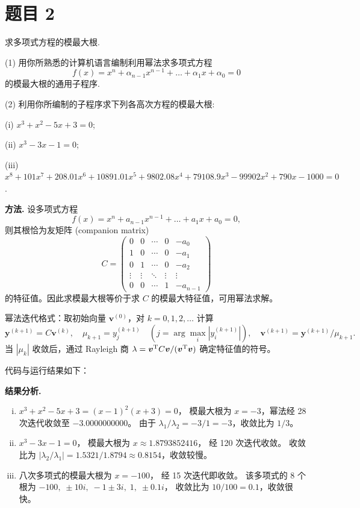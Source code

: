 \documentclass{article}
\begin{document}
\section{题目 2}

求多项式方程的模最大根.

(1) 用你所熟悉的计算机语言编制利用幂法求多项式方程
\[
  f(x) = x^n + \alpha_{n-1}x^{n-1} + \dots + \alpha_1x + \alpha_0 = 0
\]
的模最大根的通用子程序.

(2) 利用你所编制的子程序求下列各高次方程的模最大根:

(i) $x^3 + x^2 - 5x + 3 = 0$;

(ii) $x^3 - 3x - 1 = 0$;

(iii) $x^8 + 101x^7 + 208.01x^6 + 10891.01x^5 + 9802.08x^4 +
79108.9x^3 - 99902x^2 + 790x - 1000 = 0$.

\begin{solution}

  \textbf{方法.}
  设多项式方程
  \[
    f(x) = x^n + a_{n-1}x^{n-1} + \dots + a_1 x + a_0 = 0,
  \]
  则其根恰为友矩阵 (companion matrix)
  \[
    C =
    \begin{pmatrix}
      0 & 0 & \cdots & 0 & -a_0 \\
      1 & 0 & \cdots & 0 & -a_1 \\
      0 & 1 & \cdots & 0 & -a_2 \\
      \vdots & \vdots & \ddots & \vdots & \vdots \\
      0 & 0 & \cdots & 1 & -a_{n-1}
    \end{pmatrix}
  \]
  的特征值。因此求模最大根等价于求 $C$ 的模最大特征值，可用幂法求解。

  幂法迭代格式：取初始向量 $\boldsymbol{v}^{(0)}$，对 $k = 0, 1, 2, \dots$ 计算
  \[
    \boldsymbol{y}^{(k+1)} = C\boldsymbol{v}^{(k)}, \quad
    \mu_{k+1} = y_j^{(k+1)} \quad (j = \arg\max_i |y_i^{(k+1)}|), \quad
    \boldsymbol{v}^{(k+1)} = \boldsymbol{y}^{(k+1)} / \mu_{k+1}.
  \]
  当 $|\mu_k|$ 收敛后，通过 Rayleigh 商
  $\lambda = \boldsymbol{v}^{\mathrm{T}} C \boldsymbol{v} / (\boldsymbol{v}^{\mathrm{T}}
  \boldsymbol{v})$
  确定特征值的符号。

  代码与运行结果如下：

  
  

  \textbf{结果分析.}
  \begin{enumerate}[(i)]
    \item $x^3 + x^2 - 5x + 3 = (x-1)^2(x+3) = 0$，
      模最大根为 $x = -3$，幂法经 28 次迭代收敛至 $-3.0000000000$。
      由于 $\lambda_1/\lambda_2 = -3/1 = -3$，收敛比为 $1/3$。
    \item $x^3 - 3x - 1 = 0$，
      模最大根为 $x \approx 1.8793852416$，
      经 120 次迭代收敛。
      收敛比为 $|\lambda_2/\lambda_1| = 1.5321/1.8794 \approx 0.8154$，收敛较慢。
    \item 八次多项式的模最大根为 $x = -100$，
      经 15 次迭代即收敛。
      该多项式的 8 个根为 $-100,\; \pm 10i,\; -1\pm 3i,\; 1,\; \pm 0.1i$，
      收敛比为 $10/100 = 0.1$，收敛很快。
  \end{enumerate}

\end{solution}
\end{document}
